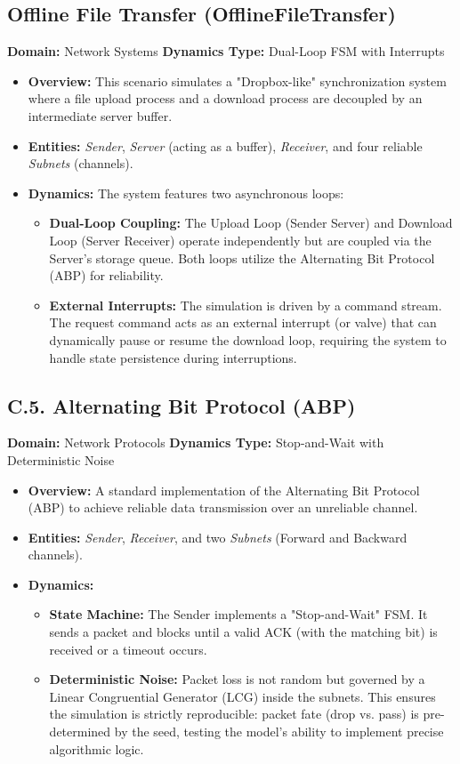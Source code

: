 \subsection{Offline File Transfer (OfflineFileTransfer)}
\textbf{Domain:} Network Systems 
\textbf{Dynamics Type:} Dual-Loop FSM with Interrupts

\begin{itemize}[leftmargin=*]
\item \textbf{Overview:} This scenario simulates a "Dropbox-like" synchronization system where a file upload process and a download process are decoupled by an intermediate server buffer.
\item \textbf{Entities:} \textit{Sender}, \textit{Server} (acting as a buffer), \textit{Receiver}, and four reliable \textit{Subnets} (channels).
\item \textbf{Dynamics:} The system features two asynchronous loops:
\begin{itemize}
\item \textbf{Dual-Loop Coupling:} The Upload Loop (Sender Server) and Download Loop (Server Receiver) operate independently but are coupled via the Server's storage queue. Both loops utilize the Alternating Bit Protocol (ABP) for reliability.
\item \textbf{External Interrupts:} The simulation is driven by a command stream. The request command acts as an external interrupt (or valve) that can dynamically pause or resume the download loop, requiring the system to handle state persistence during interruptions.
\end{itemize}
\end{itemize}

\subsection{C.5. Alternating Bit Protocol (ABP)}
\textbf{Domain:} Network Protocols 
\textbf{Dynamics Type:} Stop-and-Wait with Deterministic Noise

\begin{itemize}[leftmargin=*]
\item \textbf{Overview:} A standard implementation of the Alternating Bit Protocol (ABP) to achieve reliable data transmission over an unreliable channel.
\item \textbf{Entities:} \textit{Sender}, \textit{Receiver}, and two \textit{Subnets} (Forward and Backward channels).
\item \textbf{Dynamics:}
\begin{itemize}
\item \textbf{State Machine:} The Sender implements a "Stop-and-Wait" FSM. It sends a packet and blocks until a valid ACK (with the matching bit) is received or a timeout occurs.
\item \textbf{Deterministic Noise:} Packet loss is not random but governed by a Linear Congruential Generator (LCG) inside the subnets. This ensures the simulation is strictly reproducible: packet fate (drop vs. pass) is pre-determined by the seed, testing the model's ability to implement precise algorithmic logic.
\end{itemize}
\end{itemize}

